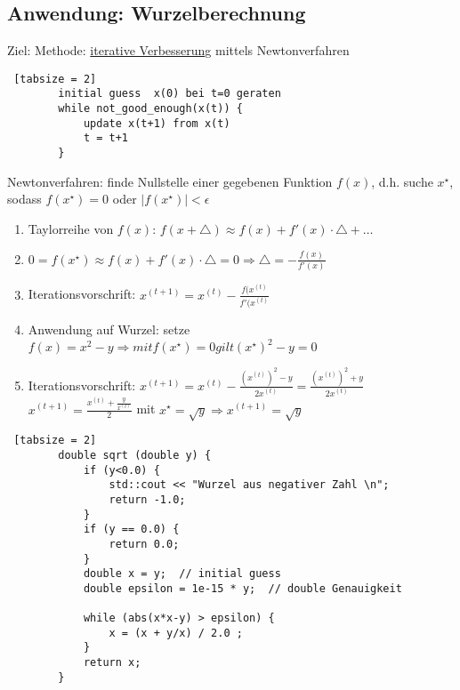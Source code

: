 \documentclass{article}
\begin{document}
	\subsection{Anwendung: Wurzelberechnung}
	
	Ziel: 
	Methode: \underline{iterative Verbesserung} mittels Newtonverfahren
	\begin{lstlisting} [tabsize = 2]
		initial guess  x(0) bei t=0 geraten
		while not_good_enough(x(t)) {
			update x(t+1) from x(t)
			t = t+1
		}
	\end{lstlisting}
	
	Newtonverfahren: finde Nullstelle einer gegebenen Funktion $f(x)$, d.h. suche $x^\star$, sodass $f(x^\star)=0$ oder $|f(x^\star)| < \epsilon$
	
	\begin{enumerate}
		\item Taylorreihe von $f(x)$: $f(x+\triangle) \approx f(x) + f'(x) \cdot \triangle + \dots$
		\item $0 = f(x^\star) \approx f(x) + f'(x) \cdot \triangle = 0 \Rightarrow \triangle = -\frac{f(x)}{f'(x)}$
		\item Iterationsvorschrift: $x^{(t+1)} = x^{(t)} - \frac{f(x^{(t)}}{f'(x^{(t)}}$
		\item Anwendung auf Wurzel: setze $f(x) = x^2 -y \Rightarrow mit f(x^\star) =0 gilt (x^\star)^2 -y=0$
		\item Iterationsvorschrift: $x^{(t+1)} = x^{(t)} - \frac{(x^{(t)})^2 -y}{2 x^{(t)}} = \frac{(x^{(t)})^2 + y}{2 x^{(t)}}$ \\
		$ x^{(t+1)} = \frac{x^{(t)} + \frac{y}{x^{(t)}}}{2}$ mit $ x^\star = \sqrt{y} \Rightarrow x^{(t+1)} = \sqrt{y}$
	\end{enumerate}
	
	\begin{lstlisting} [tabsize = 2]
		double sqrt (double y) {
			if (y<0.0) {
				std::cout << "Wurzel aus negativer Zahl \n";
				return -1.0;
			}
			if (y == 0.0) {
				return 0.0;
			}
			double x = y;  // initial guess
			double epsilon = 1e-15 * y;  // double Genauigkeit
			
			while (abs(x*x-y) > epsilon) {
				x = (x + y/x) / 2.0 ;
			}
			return x;
		}
	\end{lstlisting}
	
\end{document}
